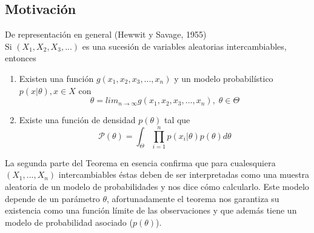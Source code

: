 \subsection{Motivación}
  \begin{theorem}{De representación en general (Hewwit y Savage, 1955)}
 \\ Si $(X_{1}, X_{2}, X_{3},...)$ es una sucesión de variables aleatorias intercambiables, entonces
 \begin{enumerate}
     \item Existen una función $g(x_{1},x_{2},x_{3},...,x_{n})$ y un modelo probabilístico $p(x\vert \theta),x\in X$ con $$\theta= lim_{n \to \infty} g(x_{1},x_{2},x_{3},...,x_{n}), \; \theta \in   \Theta$$
     \item Existe una función de densidad $p(\theta)$ tal que $$\mathcal{P}(\theta)=\int_{\Theta}\prod^{n}_{i=1} p(x_{i}\vert \theta)p(\theta)d\theta$$
     \end{enumerate}
 \end{theorem}
La segunda parte del Teorema en esencia confirma que para cualesquiera $(X_{1},...,X_{n})$ intercambiables éstas deben de ser interpretadas como una muestra aleatoria de un modelo de probabilidades y nos dice cómo calcularlo. Este modelo depende de un parámetro $\theta$, afortunadamente el teorema nos garantiza su existencia como una función límite de las observaciones y que además tiene un modelo de probabilidad asociado ($p(\theta)$). \\ 

